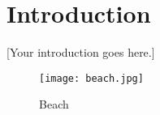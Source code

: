 \chapter*{Introduction}
\label{ch:introduction}

[Your introduction goes here.]

\begin{figure}[h]
    \centering
    \texttt{[image: beach.jpg]}
    \caption{Beach}
    \label{fig:beach}
\end{figure}

